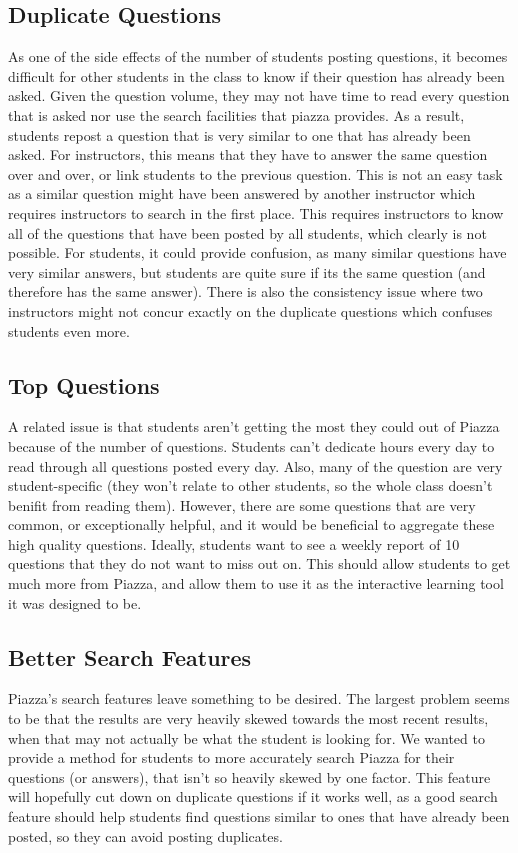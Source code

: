 \documentclass[sigconf]{acmart}
\begin{document}
\subsection{Duplicate Questions}
As one of the side effects of the number of students posting questions, it becomes difficult for other students in the class to know if their question has already been asked. Given the question volume, they may not have time to read every question that is asked nor use the search facilities that piazza provides. As a result, students repost a question that is very similar to one that has already been asked. For instructors, this means that they have to answer the same question over and over, or link students to the previous question. This is not an easy task as a similar question might have been answered by another instructor which requires instructors to search in the first place. This requires instructors to know all of the questions that have been posted by all students, which clearly is not possible. For students, it could provide confusion, as many similar questions have very similar answers, but students are quite sure if its the same question (and therefore has the same answer). There is also the consistency issue where two instructors might not concur exactly on the duplicate questions which confuses students even more.

\subsection{Top Questions}
A related issue is that students aren't getting the most they could out of Piazza because of the number of questions. Students can't dedicate hours every day to read through all questions posted every day. Also, many of the question are very student-specific (they won't relate to other students, so the whole class doesn't benifit from reading them). However, there are some questions that are very common, or exceptionally helpful, and it would be beneficial to aggregate these high quality questions. Ideally, students want to see a weekly report of 10 questions that they do not want to miss out on. This should allow students to get much more from Piazza, and allow them to use it as the interactive learning tool it was designed to be.

\subsection{Better Search Features}
Piazza's search features leave something to be desired. The largest problem seems to be that the results are very heavily skewed towards the most recent results, when that may not actually be what the student is looking for. We wanted to provide a method for students to more accurately search Piazza for their questions (or answers), that isn't so heavily skewed by one factor. This feature will hopefully cut down on duplicate questions if it works well, as a good search feature should help students find questions similar to ones that have already been posted, so they can avoid posting duplicates.
\end{document}
